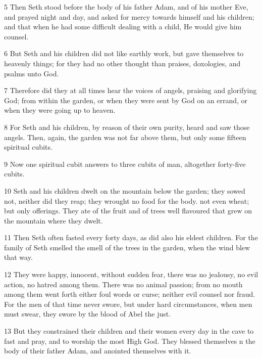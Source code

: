 \par 5 Then Seth stood before the body of his father Adam, and of his mother Eve, and prayed night and day, and asked for mercy towards himself and his children; and that when he had some difficult dealing with a child, He would give him counsel.

\par 6 But Seth and his children did not like earthly work, but gave themselves to heavenly things; for they had no other thought than praises, doxologies, and psalms unto God.

\par 7 Therefore did they at all times hear the voices of angels, praising and glorifying God; from within the garden, or when they were sent by God on an errand, or when they were going up to heaven.

\par 8 For Seth and his children, by reason of their own purity, heard and saw those angels. Then, again, the garden was not far above them, but only some fifteen spiritual cubits.

\par 9 Now one spiritual cubit answers to three cubits of man, altogether forty-five cubits.

\par 10 Seth and his children dwelt on the mountain below the garden; they sowed not, neither did they reap; they wrought no food for the body. not even wheat; but only offerings. They ate of the fruit and of trees well flavoured that grew on the mountain where they dwelt.

\par 11 Then Seth often fasted every forty days, as did also his eldest children. For the family of Seth smelled the smell of the trees in the garden, when the wind blew that way.

\par 12 They were happy, innocent, without sudden fear, there was no jealousy, no evil action, no hatred among them. There was no animal passion; from no mouth among them went forth either foul words or curse; neither evil counsel nor fraud. For the men of that time never swore, but under hard circumstances, when men must swear, they swore by the blood of Abel the just.

\par 13 But they constrained their children and their women every day in the cave to fast and pray, and to worship the most High God. They blessed themselves n the body of their father Adam, and anointed themselves with it.

